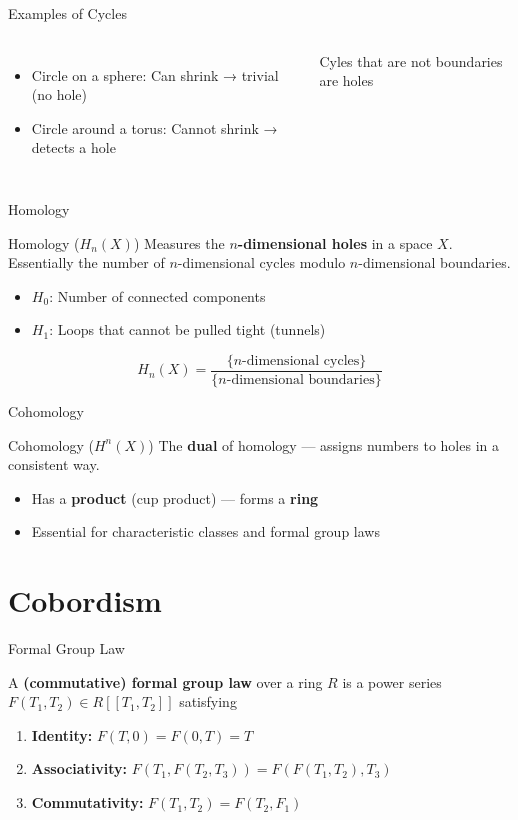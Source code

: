 \documentclass{beamer}
\begin{document}
\begin{frame}{Examples of Cycles}
  \begin{columns}
      \begin{itemize}
        \item Circle on a sphere: Can shrink → trivial (no hole)
        \item Circle around a torus: Cannot shrink → detects a hole
      \end{itemize}
      Cyles that are not boundaries are holes
  \end{columns}
\end{frame}

\begin{frame}{Homology}
  \begin{block}{Homology ($H_n(X)$)}
    Measures the \textbf{$n$-dimensional holes} in a space $X$.\\
    Essentially the number of $n$-dimensional cycles modulo $n$-dimensional boundaries.
    \begin{itemize}
      \item $H_0$: Number of connected components
      \item $H_1$: Loops that cannot be pulled tight (tunnels)
    \end{itemize}
    \[
      H_n(X) = \frac{\{\text{$n$-dimensional cycles}\}}{\{\text{$n$-dimensional boundaries}\}}
    \]
  \end{block}
\end{frame}

\begin{frame}{Cohomology}
  \begin{block}{Cohomology ($H^n(X)$)}
    The \textbf{dual} of homology — assigns numbers to holes in a consistent way.
    \begin{itemize}
      \item Has a \textbf{product} (cup product) — forms a \textbf{ring}
      \item Essential for characteristic classes and formal group laws
    \end{itemize}
  \end{block}
\end{frame}

\section{Cobordism}

\begin{frame}{Formal Group Law}
  \begin{definition}
    A \textbf{(commutative) formal group law} over a ring $R$ is a power series $F(T_1,T_2)\in R[[T_1,T_2]]$ satisfying
    \begin{enumerate}
      \item \textbf{Identity:} $F(T,0)=F(0,T)=T$
      \item \textbf{Associativity:} $F(T_1,F(T_2,T_3))=F(F(T_1,T_2),T_3)$
      \item \textbf{Commutativity:} $F(T_1,T_2)=F(T_2,F_1)$ 
    \end{enumerate}
  \end{definition}    
\end{frame}
\end{document}
